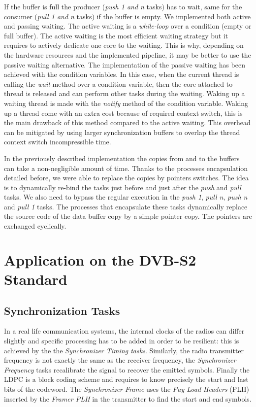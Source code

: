 If the buffer is full the producer (\emph{push 1 and n} tasks) has to wait, same
for the consumer (\emph{pull 1 and n} tasks) if the buffer is empty. We
implemented both active and passing waiting. The active waiting is a
\emph{while-loop} over a condition (empty or full buffer). The active waiting is
the most efficient waiting strategy but it requires to actively dedicate one
core to the waiting. This is why, depending on the hardware resources and the
implemented pipeline, it may be better to use the passive waiting alternative.
The implementation of the passive waiting has been achieved with the 
condition variables. In this case, when the current thread is calling the
\emph{wait} method over a condition variable, then the core attached to thread
is released and can perform other tasks during the waiting. Waking up a waiting
thread is made with the \emph{notify} method of the condition variable. Waking
up a thread come with an extra cost because of required context switch, this is
the main drawback of this method compared to the active waiting. This overhead
can be mitigated by using larger synchronization buffers to overlap the thread
context switch incompressible time.

In the previously described implementation the copies from and to the buffers
can take a non-negligible amount of time. Thanks to the processes encapsulation
detailed before, we were able to replace the copies by pointers switches. The
idea is to dynamically re-bind the tasks just before and just after the
\emph{push} and \emph{pull} tasks. We also need to bypass the regular execution
in the \emph{push 1}, \emph{pull n}, \emph{push n} and \emph{pull 1} tasks. The
processes that encapsulate these tasks dynamically replace the source code of
the data buffer copy by a simple pointer copy. The pointers are exchanged
cyclically.

\section{Application on the DVB-S2 Standard}

\subsection{Synchronization Tasks}

In a real life communication systems, the internal clocks of the radios can
differ slightly and specific processing has to be added in order to be
resilient: this is achieved by the the \emph{Synchronizer Timing tasks}.
Similarly, the radio transmitter frequency is not exactly the same as the
receiver frequency, the \emph{Synchronizer Frequency} tasks recalibrate the
signal to recover the emitted symbols. Finally the LDPC is a block coding scheme
and requires to know precisely the start and last bits of the codeword. The
\emph{Synchronizer Frame} uses the \emph{Pay Load Headers} (PLH) inserted by the
\emph{Framer PLH} in the transmitter to find the start and end symbols.

